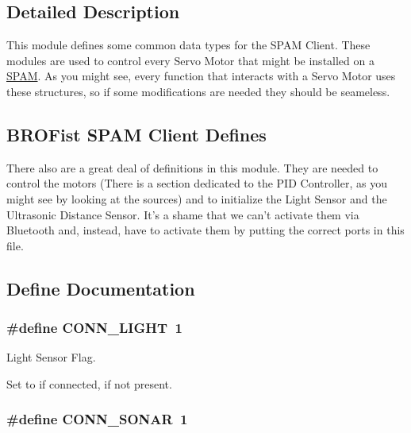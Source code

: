 \subsection{Detailed Description}
This module defines some common data types for the SPAM Client. These modules are used to control every Servo Motor that might be installed on a \hyperlink{main_SPAM}{SPAM}. As you might see, every function that interacts with a Servo Motor uses these structures, so if some modifications are needed they should be seameless.\hypertarget{group___b_r_o_s_client_BROSDefinitions}{}\subsection{BROFist SPAM Client Defines}\label{group___b_r_o_s_client_BROSDefinitions}
There also are a great deal of definitions in this module. They are needed to control the motors (There is a section dedicated to the PID Controller, as you might see by looking at the sources) and to initialize the Light Sensor and the Ultrasonic Distance Sensor. It's a shame that we can't activate them via Bluetooth and, instead, have to activate them by putting the correct ports in this file. 

\subsection{Define Documentation}
\hypertarget{group___b_r_o_s_client_ga82692265ede80e0cfdfe84a87d3093f1}{
\subsubsection[{CONN\_\-LIGHT}]{\setlength{\rightskip}{0pt plus 5cm}\#define CONN\_\-LIGHT~1}}
\label{group___b_r_o_s_client_ga82692265ede80e0cfdfe84a87d3093f1}


Light Sensor Flag. 

Set to {} if connected, {} if not present. \hypertarget{group___b_r_o_s_client_gad9e94416ba83380751dc4588286d8130}{
\subsubsection[{CONN\_\-SONAR}]{\setlength{\rightskip}{0pt plus 5cm}\#define CONN\_\-SONAR~1}}
\label{group___b_r_o_s_client_gad9e94416ba83380751dc4588286d8130}


